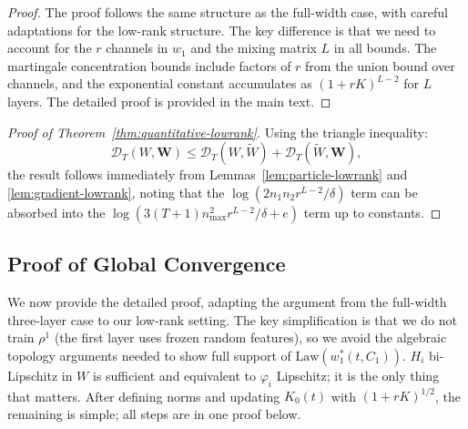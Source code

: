 \documentclass[11pt]{article}
\newcommand{\1}{\mathbbm{1}}
\begin{document}
\begin{proof}
The proof follows the same structure as the full-width case, with careful adaptations for the low-rank structure. The key difference is that we need to account for the $r$ channels in $w_1$ and the mixing matrix $L$ in all bounds. The martingale concentration bounds include factors of $r$ from the union bound over channels, and the exponential constant accumulates as $(1+rK)^{L-2}$ for $L$ layers. The detailed proof is provided in the main text.
\end{proof}

\begin{proof}[Proof of Theorem~\ref{thm:quantitative-lowrank}]
Using the triangle inequality:
\[
\mathscr{D}_T(W, \mathbf{W}) \le \mathscr{D}_T(W, \tilde{W}) + \mathscr{D}_T(\tilde{W}, \mathbf{W}),
\]
the result follows immediately from Lemmas~\ref{lem:particle-lowrank} and \ref{lem:gradient-lowrank}, noting that the $\log(2n_1n_2r^{L-2}/\delta)$ term can be absorbed into the $\log(3(T+1)n_{\max}^2r^{L-2}/\delta + e)$ term up to constants.
\end{proof}

\subsection{Proof of Global Convergence}
\label{app:global-convergence-proof}

We now provide the detailed proof, adapting the argument from the full-width three-layer case to our low-rank setting. The key simplification is that we do not train $\rho^1$ (the first layer uses frozen random features), so we avoid the algebraic topology arguments needed to show full support of $\text{Law}(w_1^*(t,C_1))$. $H_i$ bi-Lipschitz in $W$ is sufficient and equivalent to $\varphi_i$ Lipschitz; it is the only thing that matters. After defining norms and updating $K_0(t)$ with $(1+rK)^{1/2}$, the remaining is simple; all steps are in one proof below.
\end{document}
